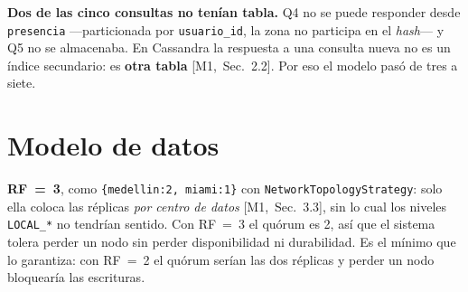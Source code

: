 \documentclass[11pt,a4paper]{article}
\newcommand{\mI}[1]{\textcolor{acento}{\small[M1,~Sec.~#1]}}
\begin{document}
\begin{hallazgo}
\textbf{Dos de las cinco consultas no tenían tabla.} Q4 no se puede responder desde
\texttt{presencia} —particionada por \texttt{usuario\_id}, la zona no participa en el
\emph{hash}— y Q5 no se almacenaba. En Cassandra la respuesta a una consulta nueva no es
un índice secundario: es \textbf{otra tabla} \mI{2.2}. Por eso el modelo pasó de tres a
siete.
\end{hallazgo}

\section{Modelo de datos}
\textbf{RF~=~3}, como \texttt{\{medellin:2, miami:1\}} con
\texttt{NetworkTopologyStrategy}: solo ella coloca las réplicas \emph{por centro de
datos} \mI{3.3}, sin lo cual los niveles \texttt{LOCAL\_*} no tendrían sentido. Con
RF~=~3 el quórum es 2, así que el sistema tolera perder un nodo sin perder
disponibilidad ni durabilidad. Es el mínimo que lo garantiza: con RF~=~2 el quórum
serían las dos réplicas y perder un nodo bloquearía las escrituras.
\end{document}
